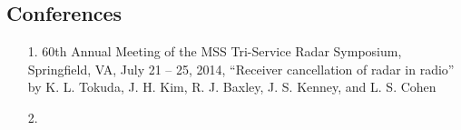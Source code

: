 \subsection{Conferences}
\begin{enumerate}
\item[1.]
60th Annual Meeting of the MSS Tri-Service Radar Symposium, Springfield, VA, July 21 -- 25, 2014, ``Receiver cancellation of radar in radio'' by K. L. Tokuda, J. H. Kim, R. J.  Baxley, J. S.  Kenney, and L. S. Cohen
\item[2.]
\end{enumerate}






